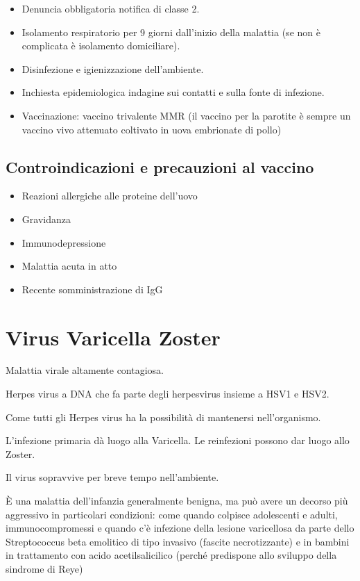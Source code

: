 \begin{itemize}
\item
  Denuncia obbligatoria notifica di classe 2.
\item
  Isolamento respiratorio per 9 giorni dall'inizio della malattia (se
  non è complicata è isolamento domiciliare).
\item
  Disinfezione e igienizzazione dell'ambiente.
\item
  Inchiesta epidemiologica indagine sui contatti e sulla fonte di
  infezione.
\item
  Vaccinazione: vaccino trivalente MMR (il vaccino per la parotite è
  sempre un vaccino vivo attenuato coltivato in uova embrionate di
  pollo)
\end{itemize}

\subsection{Controindicazioni e precauzioni al vaccino}

\begin{itemize}
\item
  Reazioni allergiche alle proteine dell'uovo
\item
  Gravidanza
\item
  Immunodepressione
\item
  Malattia acuta in atto
\item
  Recente somministrazione di IgG
\end{itemize}


\section{Virus Varicella Zoster}

Malattia virale altamente contagiosa.

Herpes virus a DNA che fa parte degli herpesvirus insieme a HSV1 e HSV2.

Come tutti gli Herpes virus ha la possibilità di mantenersi
nell'organismo.

L'infezione primaria dà luogo alla Varicella. Le reinfezioni possono dar
luogo allo Zoster.

Il virus sopravvive per breve tempo nell'ambiente.

È una malattia dell'infanzia generalmente benigna, ma può avere un
decorso più aggressivo in particolari condizioni: come quando colpisce
adolescenti e adulti, immunocompromessi e quando c'è infezione della
lesione varicellosa da parte dello Streptococcus beta emolitico di tipo
invasivo (fascite necrotizzante) e in bambini in trattamento con acido
acetilsalicilico (perché predispone allo sviluppo della sindrome di
Reye)

